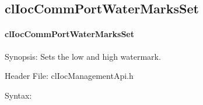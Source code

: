 \begin{flushleft}
\subsection{clIocCommPortWaterMarksSet}
\hypertarget{pageioc202}{}\paragraph{cl\-Ioc\-Comm\-Port\-Water\-Marks\-Set}\label{pageioc202}
\begin{Desc}
\item[Synopsis:]Sets the low and high watermark.\end{Desc}
\begin{Desc}
\item[Header File:]clIocManagementApi.h\end{Desc}
\begin{Desc}
\item[Syntax:]


\end{Desc}
\end{flushleft}
